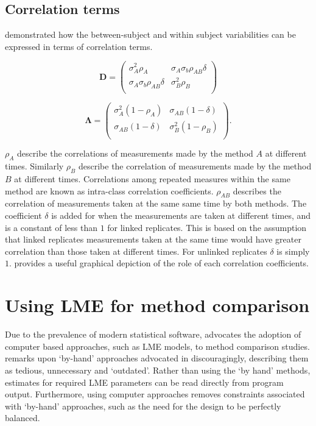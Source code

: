 \documentclass[12pt, a4paper]{report}
\theoremstyle{plain}
\theoremstyle{definition}
\theoremstyle{remark}
\begin{document}
\subsection{Correlation terms}
\citet{hamlett} demonstrated how the between-subject and within subject variabilities can be expressed in terms of
correlation terms.

\[
\boldsymbol{D} = \left( \begin{array}{cc}
                        \sigma^2_{A}\rho_{A} & \sigma_{A}\sigma_{b}\rho_{AB}\delta \\
                        \sigma_{A}\sigma_{b}\rho_{AB}\delta & \sigma^2_{B}\rho_{B}\\

                      \end{array}\right)
\]

\[
\boldsymbol{\Lambda} = \left(
\begin{array}{cc}
  \sigma^2_{A}(1-\rho_{A}) & \sigma_{AB}(1-\delta)  \\
    \sigma_{AB}(1-\delta) & \sigma^2_{B}(1-\rho_{B}) \\
\end{array}\right).
\]

$\rho_{A}$ describe the correlations of measurements made by the method $A$ at different times. Similarly $\rho_{B}$ describe the correlation of measurements made by the method $B$ at different times. Correlations among repeated measures within the same method are known as intra-class correlation coefficients. $\rho_{AB}$ describes the correlation of measurements taken at the same same time by both methods. The coefficient $\delta$ is added for when the measurements are taken at different times, and is a constant of less than $1$ for linked replicates. This is based on the assumption that linked replicates measurements taken at the same time would have greater correlation than those taken at different times. For unlinked replicates $\delta$ is simply $1$. \citet{hamlett} provides a useful graphical depiction of the role of each correlation coefficients.

\newpage
\section{Using LME for method comparison}
Due to the prevalence of modern statistical software, \citet{BXC2008} advocates the adoption of computer based approaches, such as LME models, to method comparison studies. \citet{BXC2008} remarks upon `by-hand' approaches advocated in \citet{BA99} discouragingly, describing them as tedious, unnecessary and `outdated'. Rather than using the `by hand' methods, estimates for required LME parameters can be read directly from program output. Furthermore, using computer approaches removes constraints associated with `by-hand' approaches, such as the need for the design to be perfectly balanced.
\end{document}
